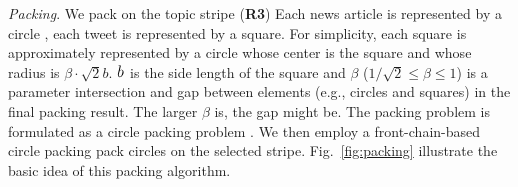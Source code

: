\emph{\normalsize Packing}. We pack  on the topic stripe %
(\textbf{\normalsize R3}) 
Each news article is represented by a circle ,  each tweet is represented by a square.
For  simplicity, each square is approximately represented by a circle whose center is  the square and whose radius is $\beta\cdot\sqrt{2}b$.
$\normalsize b$ is the side length of the square and $\beta$ ($1/\sqrt{2}\leq\beta\leq1$) is a parameter   intersection and gap between elements (e.g., circles and squares) in the final packing result.
The larger $\beta$ is, the  gap might be.
The packing problem is formulated as a circle packing problem .
We then employ a front-chain-based circle packing  pack circles  on the selected stripe.
Fig.~\ref{fig:packing} illustrate the basic idea of this packing algorithm.

